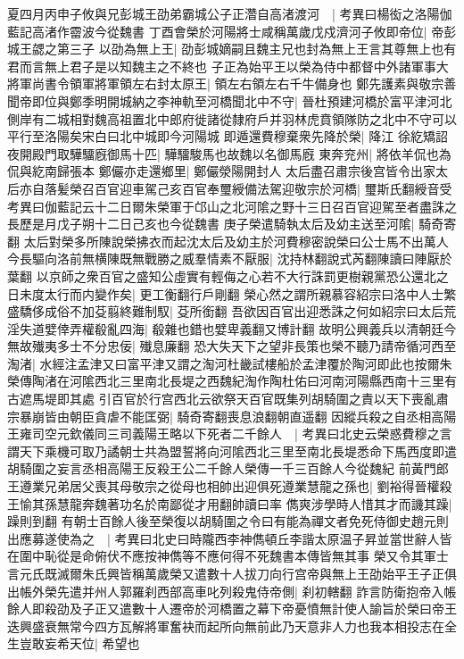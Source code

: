 夏四月丙申子攸與兄彭城王劭弟霸城公子正濳自高渚渡河　|{
	考異曰楊衒之洛陽伽藍記高渚作霤波今從魏書}
丁酉會榮於河陽將士咸稱萬歲戊戍濟河子攸即帝位|{
	帝彭城王勰之第三子}
以劭為無上王|{
	劭彭城嫡嗣且魏主兄也封為無上王言其尊無上也有君而言無上君子是以知魏主之不終也}
子正為始平王以榮為侍中都督中外諸軍事大將軍尚書令領軍將軍領左右封太原王|{
	領左右領左右千牛備身也}
鄭先護素與敬宗善聞帝即位與鄭季明開城納之李神軌至河橋聞北中不守|{
	晉杜預建河橋於富平津河北側岸有二城相對魏高祖置北中郎府徙諸從隸府戶并羽林虎賁領隊防之北中不守可以平行至洛陽矣宋白曰北中城即今河陽城}
即遁還費穆棄衆先降於榮|{
	降江}
徐紇矯詔夜開殿門取驊驑廐御馬十匹|{
	驊驑駿馬也故魏以名御馬廐}
東奔兖州|{
	將依羊侃也為侃與紇南歸張本}
鄭儼亦走還鄉里|{
	鄭儼滎陽開封人}
太后盡召肅宗後宫皆令出家太后亦自落髪榮召百官迎車駕己亥百官奉璽綬備法駕迎敬宗於河橋|{
	璽斯氏翻綬音受　考異曰伽藍記云十二日爾朱榮軍于邙山之北河隂之野十三日召百官迎駕至者盡誅之長歷是月戊子朔十二日己亥也今從魏書}
庚子榮遣騎執太后及幼主送至河隂|{
	騎奇寄翻}
太后對榮多所陳說榮拂衣而起沈太后及幼主於河費穆密說榮曰公士馬不出萬人今長驅向洛前無横陳既無戰勝之威羣情素不厭服|{
	沈持林翻說式芮翻陳讀曰陣厭於葉翻}
以京師之衆百官之盛知公虛實有輕侮之心若不大行誅罰更樹親黨恐公還北之日未度太行而内變作矣|{
	更工衡翻行戶剛翻}
榮心然之謂所親慕容紹宗曰洛中人士繁盛驕侈成俗不加芟翦終難制馭|{
	芟所銜翻}
吾欲因百官出迎悉誅之何如紹宗曰太后荒淫失道嬖倖弄權殽亂四海|{
	殽雜也錯也嬖卑義翻又博計翻}
故明公興義兵以清朝廷今無故殱夷多士不分忠佞|{
	殱息廉翻}
恐大失天下之望非長策也榮不聽乃請帝循河西至淘渚|{
	水經注孟津又曰富平津又謂之淘河杜畿試樓船於孟津覆於陶河即此也按爾朱榮傳陶渚在河隂西北三里南北長堤之西魏紀淘作陶杜佑曰河南河陽縣西南十三里有古遮馬堤即其處}
引百官於行宫西北云欲祭天百官既集列胡騎圍之責以天下喪亂肅宗暴崩皆由朝臣貪虐不能匡弼|{
	騎奇寄翻喪息浪翻朝直遥翻}
因縱兵殺之自丞相高陽王雍司空元欽儀同三司義陽王略以下死者二千餘人　|{
	考異曰北史云榮惑費穆之言謂天下乘機可取乃譎朝士共為盟誓將向河隂西北三里至南北長堤悉命下馬西度即遣胡騎圍之妄言丞相高陽王反殺王公二千餘人榮傳一千三百餘人今從魏紀}
前黃門郎王遵業兄弟居父喪其母敬宗之從母也相帥出迎俱死遵業慧龍之孫也|{
	劉裕得晉權殺王愉其孫慧龍奔魏著功名於南鄙從才用翻帥讀曰率}
儁爽涉學時人惜其才而譏其躁|{
	躁則到翻}
有朝士百餘人後至榮復以胡騎圍之令曰有能為禪文者免死侍御史趙元則出應募遂使為之　|{
	考異曰北史曰時隴西李神儁頓丘李諧太原温子昇並當世辭人皆在圍中恥從是命俯伏不應按神儁等不應何得不死魏書本傳皆無其事}
榮又令其軍士言元氏既滅爾朱氏興皆稱萬歲榮又遣數十人拔刀向行宫帝與無上王劭始平王子正俱出帳外榮先遣并州人郭羅刹西部高車叱列殺鬼侍帝側|{
	刹初轄翻}
詐言防衛抱帝入帳餘人即殺劭及子正又遣數十人遷帝於河橋置之幕下帝憂憤無計使人諭旨於榮曰帝王迭興盛衰無常今四方瓦解將軍奮袂而起所向無前此乃天意非人力也我本相投志在全生豈敢妄希天位|{
	希望也}
